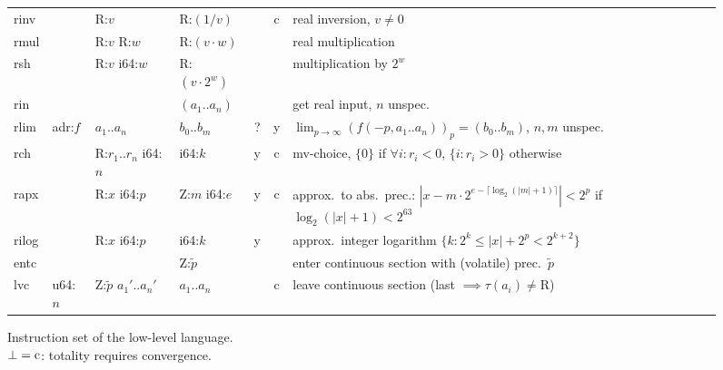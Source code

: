 \documentclass[a4paper,parskip=half]{scrartcl}
\begin{document}
\begin{figure}[h]
\begin{tabular}{l|l|l|l@{\;\,\vline\,}c@{\,\vline\,}c@{\,\vline\;\,}p{9cm}}
  \ttfamily rinv  &         & R:$v$           & R:$(1/v)$       & &c& real inversion, $v\neq0$ \\
  \ttfamily rmul  &         & R:$v$ R:$w$     & R:$(v\cdot w)$  & && real multiplication \\
  \ttfamily rsh   &         & R:$v$ i64:$w$   & R:$(v\cdot2^w)$ & && multiplication by $2^w$ \\
  \ttfamily rin   &         &                 & $(a_1..a_n)$    & && get real input, $n$ unspec. \\
  \hline
  \ttfamily rlim  & adr:$f$ & $a_1..a_n$ & $b_0..b_m$ &?&y& $\lim_{p\to\infty}{(f(-p,a_1..a_n))_p} = (b_0..b_m)$, $n,m$ unspec. \\[-1.35ex]\hline\noalign{\vspace{\dimexpr 1.35ex-.5pt}}
  \ttfamily rch   &         & R:$r_1..r_n$ i64:$n$ & i64:$k$    &y&c& mv-choice, $\{0\}$ if $\forall i:r_i<0$, $\{i:r_i>0\}$ otherwise \\
  \ttfamily rapx  &         & R:$x$ i64:$p$   & Z:$m$ i64:$e$   &y&c& approx.\ to abs.\ prec.: $|x-m\cdot2^{e-\lceil\log_2(|m|+1)\rceil}|<2^p$ if $\log_2(|x|+1)<2^{63}$ \\
  \ttfamily rilog &         & R:$x$ i64:$p$   & i64:$k$         &y&& approx.\ integer logarithm $\{k:2^k\leq|x|+2^p<2^{k+2}\}$ \\[-1.35ex]\hline\noalign{\vspace{\dimexpr 1.35ex-.5pt}}
  \hline
  \ttfamily entc  &         &                           & Z:$\tilde p$ && & enter continuous section with (volatile) prec.\ $\tilde p$ \\
  \ttfamily lvc   & u64:$n$ & Z:$\tilde p$ $a_1'..a_n'$ & $a_1..a_n$   &&c& leave continuous section (last $\implies\tau(a_i)\neq\text{R}$)
\end{tabular}
\caption{Instruction set of the low-level language. \\
	$\bot=\text c$: totality requires convergence.}
\label{fig:instrs}
\end{figure}

\restoregeometry
\newpage

\newcommand*\dom{\operatorname{dom}}
\newcommand*\Top{\operatorname{top}}
\end{document}
